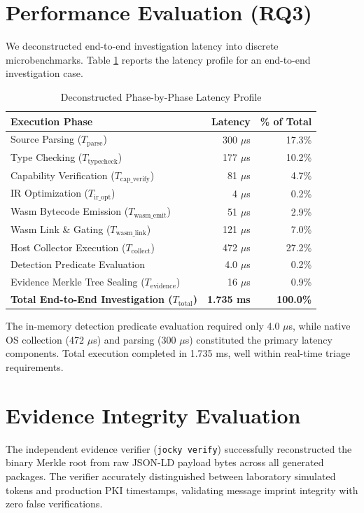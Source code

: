 \documentclass[10pt,conference]{IEEEtran}
\begin{document}
\section{Performance Evaluation (RQ3)}
We deconstructed end-to-end investigation latency into discrete microbenchmarks. Table \ref{tab:latency} reports the latency profile for an end-to-end investigation case.

\begin{table}[h]
\centering
\caption{Deconstructed Phase-by-Phase Latency Profile}
\label{tab:latency}
\begin{tabular}{@{}lrr@{}}
\toprule
\textbf{Execution Phase} & \textbf{Latency} & \textbf{\% of Total} \\ \midrule
Source Parsing ($T_{\text{parse}}$) & 300 $\mu$s & 17.3\% \\
Type Checking ($T_{\text{typecheck}}$) & 177 $\mu$s & 10.2\% \\
Capability Verification ($T_{\text{cap\_verify}}$) & 81 $\mu$s & 4.7\% \\
IR Optimization ($T_{\text{ir\_opt}}$) & 4 $\mu$s & 0.2\% \\
Wasm Bytecode Emission ($T_{\text{wasm\_emit}}$) & 51 $\mu$s & 2.9\% \\
Wasm Link \& Gating ($T_{\text{wasm\_link}}$) & 121 $\mu$s & 7.0\% \\
Host Collector Execution ($T_{\text{collect}}$) & 472 $\mu$s & 27.2\% \\
Detection Predicate Evaluation & 4.0 $\mu$s & 0.2\% \\
Evidence Merkle Tree Sealing ($T_{\text{evidence}}$) & 16 $\mu$s & 0.9\% \\ \midrule
\textbf{Total End-to-End Investigation ($T_{\text{total}}$)} & \textbf{1.735 ms} & \textbf{100.0\%} \\ \bottomrule
\end{tabular}
\end{table}

The in-memory detection predicate evaluation required only 4.0 $\mu$s, while native OS collection (472 $\mu$s) and parsing (300 $\mu$s) constituted the primary latency components. Total execution completed in 1.735 ms, well within real-time triage requirements.

\section{Evidence Integrity Evaluation}
The independent evidence verifier (\texttt{jocky verify}) successfully reconstructed the binary Merkle root from raw JSON-LD payload bytes across all generated packages. The verifier accurately distinguished between laboratory simulated tokens and production PKI timestamps, validating message imprint integrity with zero false verifications.
\end{document}
